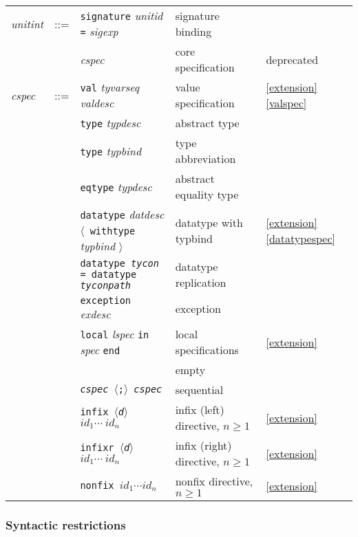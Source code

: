 \documentclass[fleqn,a4paper]{article}
\newcounter{extension}
\newcommand{\x}[1][]{\ref{extension}{#1}}
\newcommand{\la}{$\langle$}
\newcommand{\ra}{$\rangle$}
\begin{document}
\begin{tabular}{lllll}
{\it unitint\/} & ::= 
  & {\tt signature} {\it unitid} {\tt =}  {\it sigexp\/} 
                                                & signature binding \\
& & {\it cspec\/}                               & core specification & deprecated \\[2ex]

{\it cspec} & ::= & {\tt val}  {\it tyvarseq\/} {\it valdesc}    & value specification & \x[\ref{valspec}] \\ 
& & {\tt type} {\it typdesc}                    & abstract type \\
& & {\tt type} {\it typbind}            & type abbreviation \\
& & {\tt eqtype} {\it typdesc}          & abstract equality type\\
& & {\tt datatype} {\it datdesc} \la\ {\tt withtype} {\it typbind\/} \ra\ &
                                          datatype with typbind & \x[\ref{datatypespec}]\\
& & {\tt datatype {\it tycon\/} = datatype {\it tyconpath\/}}
& datatype replication\\
& & {\tt exception} {\it exdesc}        & exception\\
& & {\tt local} {\it lspec} {\tt in} {\it spec} {\tt end}
                                        & local specifications & \x\\
& &                                     & empty\\
& & {\tt {\it cspec} $\langle${;}$\rangle$ {\it cspec}} & sequential\\
& & {\tt infix \la{\it d\/}\ra\ $id_1 \cdots\ id_n$} & infix (left)
  directive, $n\geq 1$ & \x \\
& & {\tt infixr \la{\it d\/}\ra\ $id_1 \cdots\ id_n$} & infix (right)
  directive, $n\geq 1$ & \x \\
& & {\tt nonfix $id_1 \cdots id_n$} & nonfix directive, $n\geq 1$ & \x \\[2ex]
\end{tabular}

\subsubsection*{Syntactic restrictions}
\end{document}
